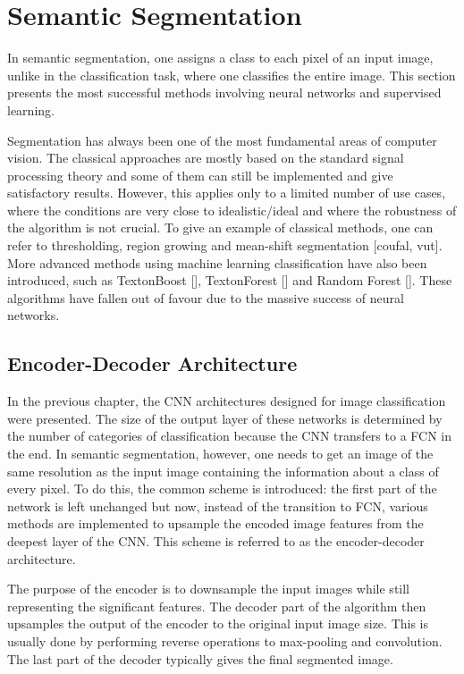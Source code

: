\section{Semantic Segmentation}

In semantic segmentation, one assigns a class to each pixel of an input image, unlike in the classification task, where one classifies the entire image. This section presents the most successful methods involving neural networks and supervised learning. 

Segmentation has always been one of the most fundamental areas of computer vision. The classical approaches are mostly based on the standard signal processing theory and some of them can still be implemented and give satisfactory results. However, this applies only to a limited number of use cases, where the conditions are very close to idealistic/ideal and where the robustness of the algorithm is not crucial. To give an example of classical methods, one can refer to thresholding, region growing and mean-shift segmentation [coufal, vut]. More advanced methods using machine learning classification have also been introduced, such as TextonBoost [], TextonForest [] and Random Forest []. These algorithms have fallen out of favour due to the massive success of neural networks.

\subsection{Encoder-Decoder Architecture}

In the previous chapter, the CNN architectures designed for image classification were presented. The size of the output layer of these networks is determined by the number of categories of classification because the CNN transfers to a FCN in the end. In semantic segmentation, however, one needs to get an image of the same resolution as the input image containing the information about a class of every pixel. To do this, the common scheme is introduced: the first part of the network is left unchanged but now, instead of the transition to FCN, various methods are implemented to upsample the encoded image features from the deepest layer of the CNN. This scheme is referred to as the encoder-decoder architecture. 

The purpose of the encoder is to downsample the input images while still representing the significant features. The decoder part of the algorithm then upsamples the output of the encoder to the original input image size. This is usually done by performing reverse operations to max-pooling and convolution. The last part of the decoder typically gives the final segmented image. 

